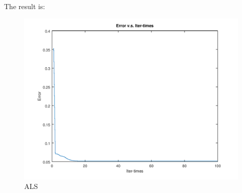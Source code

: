 \documentclass[a4paper, 11pt]{article}
\begin{document}
The result is:
\begin{figure}[htbp]
\centering
	\includegraphics[scale=0.6]{figure/p3.png}
	\caption{ALS}
	\label{fig4}
\end{figure}
\end{document}
